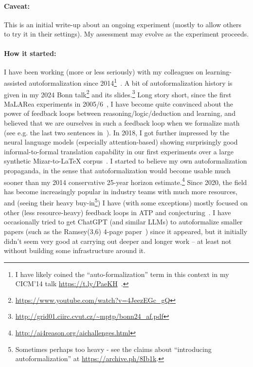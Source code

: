 \documentclass[a4paper,UKenglish,cleveref, autoref, thm-restate]{lipics-v2021}
\begin{document}
%
%
%

%
%
%

\paragraph*{Caveat:} This is an initial write-up about an ongoing
experiment (mostly to allow others to try it in their settings). My
assessment may evolve as the experiment proceeds.

\paragraph*{How it started:} I have been working (more or less seriously) with my colleagues on
learning-assisted autoformalization since 2014\footnote{I have likely
  coined the ``auto-formalization'' term in this context in my CICM'14
  talk \url{https://t.ly/PaeKH}~\cite{DBLP:conf/mkm/KaliszykUVG14}.}~\cite{DBLP:conf/mkm/KaliszykUVG14,DBLP:conf/itp/KaliszykUV15}. A bit of autoformalization history is given in my
2024 Bonn talk\footnote{\url{https://www.youtube.com/watch?v=4JeezEGc_gQ}} and its slides.\footnote{\url{http://grid01.ciirc.cvut.cz/~mptp/bonn24_af.pdf}} Long story
short, since the first MaLARea experiments in 2005/6~\cite{DBLP:conf/cade/Urban07}, I have become
quite convinced about the power of feedback loops between
reasoning/logic/deduction and learning, and believed that we are
ourselves in such a feedback loop when we formalize math (see e.g. the last two sentences in~\cite{DBLP:conf/lpar/Urban08}).
In 2018, I got further
impressed by the neural language models (especially attention-based)
showing surprisingly good informal-to-formal translation capability in
our first experiments over a large synthetic Mizar-to-LaTeX
corpus~\cite{DBLP:conf/mkm/WangKU18}. I started to believe my own
autoformalization propaganda, in the sense that autoformalization
would become usable much sooner than my 2014 conservative 25-year horizon
estimate.\footnote{\url{http://ai4reason.org/aichallenges.html}}
Since 2020, the field has become increasingly
popular in industry teams with much more resources, and (seeing their heavy buy-in\footnote{Sometimes perhaps too heavy - see the claims about ``introducing autoformalization'' at \url{https://archive.ph/8Ib1k}.}) I have (with some exceptions) mostly focused on other (less resource-heavy) feedback loops in ATP and conjecturing~\cite{DBLP:conf/mkm/UrbanJ20,DBLP:conf/itp/JakubuvCGKOP00U23,DBLP:journals/ijar/GauthierOU23,DBLP:conf/cade/GauthierU25,DBLP:journals/jsc/PiepenbrockUKOHJ25}.
I have occasionally tried to get ChatGPT (and similar LLMs)
to autoformalize smaller papers (such as the Ramsey(3,6) 4-page paper~\cite{cariolaro1999ramsey}) since it
appeared, but it initially didn't seem very good at carrying out
deeper and longer work -- at least not without building some infrastructure
around it.
\end{document}
